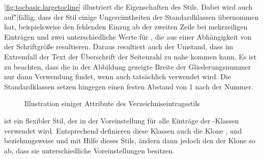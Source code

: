 \begin{description}
  \autoref{fig:tocbasic.largetocline} illustriert die
  Eigenschaften
  des Stils. Dabei wird auch auf"|fällig, dass der Stil einige Ungereimtheiten
  der Standardklassen übernommen hat, beispielsweise den fehlenden Einzug ab
  der zweiten Zeile bei mehrzeiligen Einträgen und zwei unterschiedliche Werte
  für , die aus einer Abhängigkeit von der Schriftgröße
  resultieren. Daraus resultiert auch der Umstand, dass im Extremfall der Text
  der Überschrift der Seitenzahl zu nahe kommen kann.  Es ist zu beachten, dass
  die in der Abbildung gezeigte Breite der Gliederungsnummer nur dann
  Verwendung findet, wenn auch tatsächlich 
  verwendet wird. Die Standardklassen setzen hingegen einen festen Abstand von
  1 nach der Nummer.
  \begin{figure}
    \centering
    \caption{Illustration einiger Attribute des Verzeichniseintragsstils
      }
    \label{fig:tocbasic.largetocline}
  \end{figure}
\item[\PValue{tocline}] ist ein flexibler Stil, der in der Voreinstellung für
  alle Einträge der \KOMAScript-Klassen verwendet wird. Entsprechend
  definieren diese Klassen auch die Klone ,  und
   beziehungsweise  und 
  mit Hilfe dieses Stils, ändern dann jedoch den 
  der Klone so ab, dass sie unterschiedliche Voreinstellungen besitzen.


\end{description}
